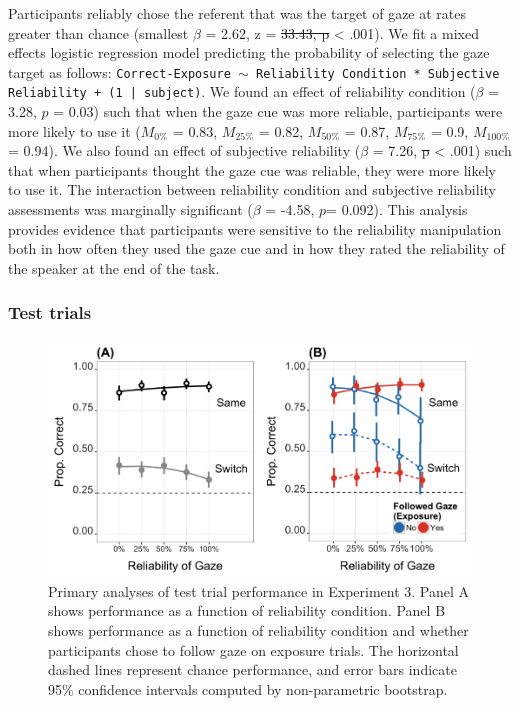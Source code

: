 \documentclass[authoryear, review]{elsarticle}
\newenvironment{CodeChunk}{}{}
\providecommand{\DIFaddtex}[1]{{\protect\color{blue}\uwave{#1}}} %
\providecommand{\DIFdeltex}[1]{{\protect\color{red}\sout{#1}}}                      %
\providecommand{\DIFaddbegin}{} %
\providecommand{\DIFaddend}{} %
\providecommand{\DIFdelbegin}{} %
\providecommand{\DIFdelend}{} %
\providecommand{\DIFadd}[1]{\texorpdfstring{\DIFaddtex{#1}}{#1}} %
\providecommand{\DIFdel}[1]{\texorpdfstring{\DIFdeltex{#1}}{}} %
\begin{document}
Participants reliably chose the referent that was the target of gaze at
rates greater than chance (smallest \(\beta\) = 2.62, z = \DIFdelbegin \DIFdel{33.43, p
}\DIFdelend \DIFaddbegin \DIFadd{31.99, \(p\)
}\DIFaddend \textless{} .001). We fit a mixed effects logistic regression model
predicting the probability of selecting the gaze target as follows:
\texttt{Correct-Exposure $\sim$ Reliability Condition * Subjective Reliability + (1 | subject)}.
We found an effect of reliability condition (\(\beta\) = 3.28, \(p\) =
0.03) such that when the gaze cue was more reliable, participants were
more likely to use it (\(M_{0\%}\) = 0.83, \(M_{25\%}\) = 0.82,
\(M_{50\%}\) = 0.87, \(M_{75\%}\) = 0.9, \(M_{100\%}\) = 0.94). We also
found an effect of subjective reliability (\(\beta\) = 7.26, \DIFdelbegin \DIFdel{p
}\DIFdelend \DIFaddbegin \DIFadd{\(p\)
}\DIFaddend \textless{} .001) such that when participants thought the gaze cue was
reliable, they were more likely to use it. The interaction between
reliability condition and subjective reliability assessments was
marginally significant (\(\beta\) = -4.58, \(p\)= 0.092). This analysis
provides evidence that participants were sensitive to the reliability
manipulation both in how often they used the gaze cue and in how they
rated the reliability of the speaker at the end of the task.

\subsubsection{Test trials}\label{test-trials-2}

\begin{CodeChunk}
\begin{figure}[tb]

{\centering \includegraphics[width=0.9\linewidth]{figs/e3-plot-1} 

}

\caption[Primary analyses of test trial performance in Experiment 3]{Primary analyses of test trial performance in Experiment 3. Panel A shows performance as a function of reliability condition. Panel B shows performance as a function of reliability condition and whether participants chose to follow gaze on exposure trials. The horizontal dashed lines represent chance performance, and error bars indicate 95\% confidence intervals computed by non-parametric bootstrap.}\label{fig:e3-plot}
\end{figure}
\end{CodeChunk}
\end{document}
